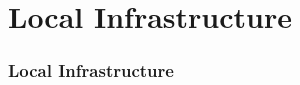 \section[Section]{Local Infrastructure}

\begin{frame}
    \frametitle{Local Infrastructure}
\end{frame}

